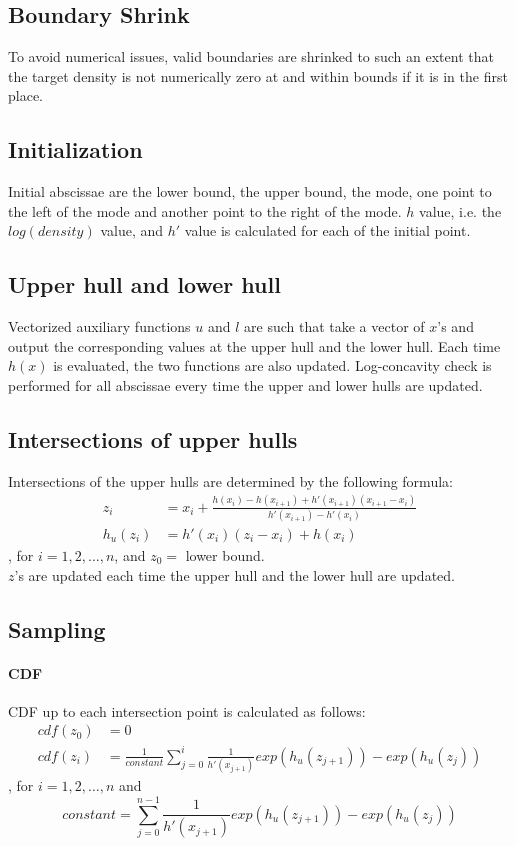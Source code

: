 \documentclass{article}\usepackage[]{graphicx}\usepackage[]{color}
\begin{document}
\subsection{Boundary Shrink}
To avoid numerical issues, valid boundaries are shrinked to such an extent that 
the target density is not numerically zero at and within bounds if it is in the 
first place.

\subsection{Initialization}
Initial abscissae are the lower bound, the upper bound, the mode, one point to
the left of the mode and another point to the right of the mode. $h$ value, i.e.
the $log(density)$ value, and $h'$ value is calculated for each of the initial
point.

\subsection{Upper hull and lower hull}
Vectorized auxiliary functions $u$ and $l$ are such that take a vector of $x$'s 
and output the corresponding values at the upper hull and the lower hull. Each time
$h(x)$ is evaluated, the two functions are also updated. Log-concavity check is
performed for all abscissae every time the upper and lower hulls are updated.

\subsection{Intersections of upper hulls}
Intersections of the upper hulls are determined by the following formula:\\
\begin{align*}
z_i &= x_i + \frac{h(x_i) - h(x_{i+1}) + h'(x_{i+1})(x_{i+1} - x_i)}{h'(x_{i+1}) - h'(x_i)}\\
h_u(z_i) &= h'(x_i)(z_i - x_i) + h(x_i)
\end{align*}
, for $i = 1, 2, \dots, n$, and $z_0 = $ lower bound.\\
$z$'s are updated each time the upper hull and the lower hull are updated.

\subsection{Sampling}
\paragraph{CDF}
CDF up to each intersection point is calculated as follows:\\
\begin{align*}
cdf(z_0) &= 0\\
cdf(z_i) &= \frac{1}{constant}\sum_{j = 0}^{i} \frac{1}{h'(x_{j+1})}{exp(h_u(z_{j+1})) - exp(h_u(z_{j}))}
\end{align*}
, for $i = 1, 2, \dots, n$ and 
$$constant = \sum_{j = 0}^{n-1} \frac{1}{h'(x_{j+1})}{exp(h_u(z_{j+1})) - exp(h_u(z_{j}))}$$
\end{document}
